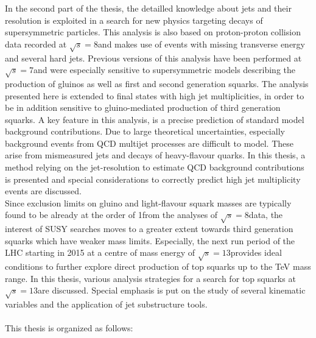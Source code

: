 In the second part of the thesis, the detailled knowledge about jets and their resolution is exploited in a search for new physics targeting decays of supersymmetric particles. This analysis is also based on proton-proton collision data recorded at $\sqrt{s} = 8$\tev and makes use of events with missing transverse energy and several hard jets. Previous versions of this analysis have been performed at $\sqrt{s} = 7$\tev and were especially sensitive to supersymmetric models describing the production of gluinos as well as first and second generation squarks. The analysis presented here is extended to final states with high jet multiplicities, in order to be in addition sensitive to gluino-mediated production of third generation squarks. A key feature in this analysis, is a precise prediction of standard model background contributions. Due to large theoretical uncertainties, especially background events from QCD multijet processes are difficult to model. These arise from mismeasured jets and decays of heavy-flavour quarks. In this thesis, a method relying on the jet-\pt resolution to estimate QCD background contributions is presented and special considerations to correctly predict high jet multiplicity events are discussed.  \\
Since exclusion limits on gluino and light-flavour squark masses are typically found to be already at the order of 1\tev from the analyses of $\sqrt{s} = 8$\tev data, the interest of SUSY searches moves to a greater extent towards third generation squarks which have weaker mass limits. Especially, the next run period of the LHC starting in 2015 at a centre of mass energy of $\sqrt{s} = 13$\tev provides ideal conditions to further explore direct production of top squarks up to the TeV mass range. In this thesis, various analysis strategies for a search for top squarks at $\sqrt{s} = 13$\tev are discussed. Special emphasis is put on the study of several kinematic variables and the application of jet substructure tools. \\ 
\\
This thesis is organized as follows:
